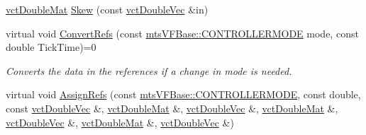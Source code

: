 \begin{DoxyCompactItemize}
\hyperlink{vct_dynamic_matrix_types_8h_a48f1eb2461d20a99e824ee5753a37c84}{vct\-Double\-Mat} \hyperlink{classmts_v_f_base_ab028f64fbea9be4e6d6529a3c1b7ad9b}{Skew} (const \hyperlink{vct_dynamic_vector_types_8h_ade4b3068c86fb88f41af2e5187e491c2}{vct\-Double\-Vec} \&in)
\item 
virtual void \hyperlink{classmts_v_f_base_acca2d183c9ca2659d3cf6c0af5120b55}{Convert\-Refs} (const \hyperlink{classmts_v_f_base_a742dd08f8b70bafeb746cec14d9ee974}{mts\-V\-F\-Base\-::\-C\-O\-N\-T\-R\-O\-L\-L\-E\-R\-M\-O\-D\-E} mode, const double Tick\-Time)=0
\begin{DoxyCompactList}\small\item\em Converts the data in the references if a change in mode is needed. \end{DoxyCompactList}\item 
virtual void \hyperlink{classmts_v_f_base_ad5081f5e82db7c18483dc5defbeae620}{Assign\-Refs} (const \hyperlink{classmts_v_f_base_a742dd08f8b70bafeb746cec14d9ee974}{mts\-V\-F\-Base\-::\-C\-O\-N\-T\-R\-O\-L\-L\-E\-R\-M\-O\-D\-E}, const double, const \hyperlink{vct_dynamic_vector_types_8h_ade4b3068c86fb88f41af2e5187e491c2}{vct\-Double\-Vec} \&, \hyperlink{vct_dynamic_matrix_types_8h_a48f1eb2461d20a99e824ee5753a37c84}{vct\-Double\-Mat} \&, \hyperlink{vct_dynamic_vector_types_8h_ade4b3068c86fb88f41af2e5187e491c2}{vct\-Double\-Vec} \&, \hyperlink{vct_dynamic_matrix_types_8h_a48f1eb2461d20a99e824ee5753a37c84}{vct\-Double\-Mat} \&, \hyperlink{vct_dynamic_vector_types_8h_ade4b3068c86fb88f41af2e5187e491c2}{vct\-Double\-Vec} \&, \hyperlink{vct_dynamic_matrix_types_8h_a48f1eb2461d20a99e824ee5753a37c84}{vct\-Double\-Mat} \&, \hyperlink{vct_dynamic_vector_types_8h_ade4b3068c86fb88f41af2e5187e491c2}{vct\-Double\-Vec} \&)
\end{DoxyCompactItemize}

